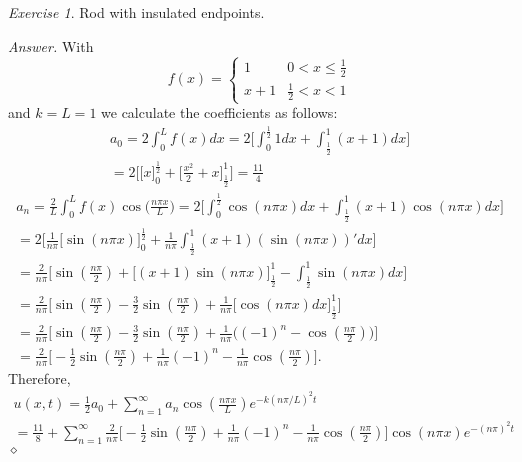 \documentclass[12pt,oneside]{amsart}
\theoremstyle{definition}
\theoremstyle{remark}
\newtheorem{exer}{Exercise}
\numberwithin{equation}{exer}
\newenvironment{answer}{\bigskip\noindent\emph{Answer.}}{\hfill$\diamond$\newline}
\begin{document}
\newpage
\indent \newline

\begin{exer}
Rod with insulated endpoints. 
\end{exer}
\begin{answer}
With 
\begin{equation*}
    f(x) = \begin{cases}
               1               & 0 < x \leq \frac{1}{2}\\
               x+1               & \frac{1}{2} <x <1
           \end{cases}
\end{equation*}
and $k=L=1$ we calculate the coefficients as follows:
\begin{align*}
    a_0 = 2\int_0^L f(x) dx = 2\Bigg[ \int_0^{\frac{1}{2}} 1 dx + \int_\frac{1}{2}^{1} (x+1) dx\Bigg]\\
    =2 \Bigg[ \big[x\big]_0^{\frac{1}{2}} + \Big[\frac{x^2}{2} + x\Big]_{\frac{1}{2}}^1\Bigg]     = \frac{11}{4}
\end{align*}
\begin{align*}
    a_n = \frac{2}{L}\int_{0}^{L} f(x) \cos \big(\frac{n \pi x}{L}\big) = 2 \Bigg[\int_{0}^{\frac{1}{2}} \cos(n \pi x) dx + \int_{\frac{1}{2}}^1 (x+1) \cos(n \pi x)dx\Bigg]\\
    = 2 \Bigg[ \frac{1}{n \pi} \Big[ \sin (n \pi x)\Big]_0^{\frac{1}{2}} + \frac{1}{n \pi}\int_{\frac{1}{2}}^1 (x+1)(\sin(n \pi x))'dx\Bigg] \\
    =\frac{2}{n \pi} \Bigg[ \sin(\frac{n \pi}{2}) + \Big[(x+1)\sin(n \pi x)\Big]_{\frac{1}{2}}^1 - \int_{\frac{1}{2}}^1 \sin(n \pi x)dx\Bigg]\\
    = \frac{2}{n \pi} \Bigg[ \sin(\frac{n \pi}{2}) - \frac{3}{2}\sin(\frac{n \pi}{2}) + \frac{1}{n \pi} \Big[\cos(n \pi x) dx\Big]_{\frac{1}{2}}^1 \Bigg]\\
    = \frac{2}{n \pi} \Bigg[ \sin(\frac{n \pi}{2}) - \frac{3}{2}\sin(\frac{n \pi}{2}) + \frac{1}{n \pi} \Big((-1)^n - \cos(\frac{n \pi}{2})\Big)\Bigg]\\
    =\frac{2}{n \pi} \Bigg[ -\frac{1}{2} \sin(\frac{n \pi}{2}) + \frac{1}{n \pi} (-1)^n - \frac{1}{n \pi}\cos(\frac{n \pi}{2})\Bigg].
\end{align*}
Therefore,
\begin{align*}
        u(x,t) = \frac{1}{2}a_0 + \sum_{n=1}^{\infty} a_n \cos (\frac{n \pi x}{L}) e^{-k(n \pi / L)^2t}\\
        = \frac{11}{8}+\sum_{n=1}^{\infty}\frac{2}{n \pi} \Big[ -\frac{1}{2} \sin(\frac{n \pi}{2}) + \frac{1}{n \pi} (-1)^n - \frac{1}{n \pi}\cos(\frac{n \pi}{2})\Big]\cos(n \pi x) e^{-(n \pi)^2t}
\end{align*}
\end{answer}
\end{document}

